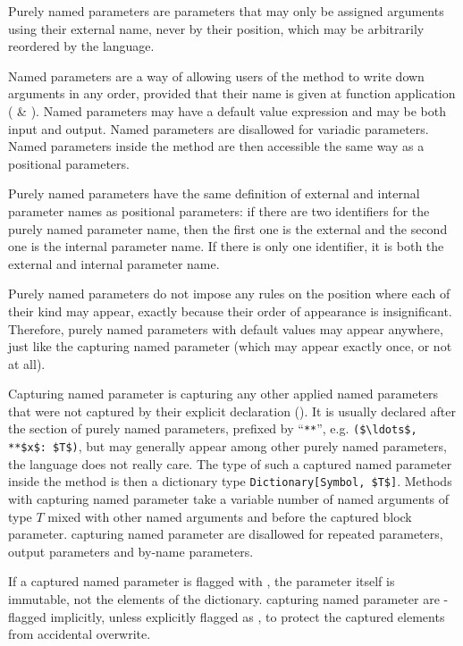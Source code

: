 Purely named parameters are parameters that may only be assigned arguments using their external name, never by their position, which may be arbitrarily reordered by the language. 

Named parameters are a way of allowing users of the method to write down arguments in any order, provided that their name is given at function application ( \& ). Named parameters may have a default value expression and may be both input and output. Named parameters are disallowed for variadic parameters. Named parameters inside the method are then accessible the same way as a positional parameters. 

Purely named parameters have the same definition of external and internal parameter names as positional parameters: if there are two identifiers for the purely named parameter name, then the first one is the external and the second one is the internal parameter name. If there is only one identifier, it is both the external and internal parameter name. 

Purely named parameters do not impose any rules on the position where each of their kind may appear, exactly because their order of appearance is insignificant. Therefore, purely named parameters with default values may appear anywhere, just like the capturing named parameter (which may appear exactly once, or not at all). 

Capturing named parameter is capturing any other applied named parameters that were not captured by their explicit declaration (). It is usually declared after the section of purely named parameters, prefixed by ``\lstinline!**!'', e.g. \lstinline!($\ldots$, **$x$: $T$)!, but may generally appear among other purely named parameters, the language does not really care. The type of such a captured named parameter inside the method is then a dictionary type \lstinline!Dictionary[Symbol, $T$]!. Methods with capturing named parameter take a variable number of named arguments of type $T$ mixed with other named arguments and before the captured block parameter. capturing named parameter are disallowed for repeated parameters, output parameters and by-name parameters. 

If a captured named parameter is flagged with , the parameter itself is immutable, not the elements of the dictionary. capturing named parameter are -flagged implicitly, unless explicitly flagged as , to protect the captured elements from accidental overwrite. 


